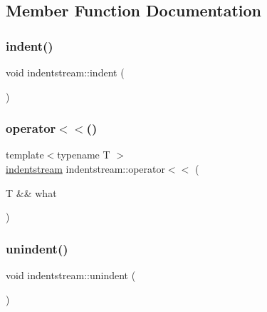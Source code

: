 \subsection{Member Function Documentation}
\mbox{\label{structindentstream_a698fbc575ef8753cf5b38d32a71cd1e4}} 
\subsubsection{\texorpdfstring{indent()}{indent()}}
{\footnotesize\ttfamily void indentstream\+::indent (\begin{DoxyParamCaption}{ }\end{DoxyParamCaption})\hspace{0.3cm}{\ttfamily [inline]}}

\mbox{\label{structindentstream_a15d0ddc057725bdfb44c9ac465d1324c}} 
\subsubsection{\texorpdfstring{operator$<$$<$()}{operator<<()}}
{\footnotesize\ttfamily template$<$typename T $>$ \\
\hyperlink{structindentstream}{indentstream} indentstream\+::operator$<$$<$ (\begin{DoxyParamCaption}\item[{T \&\&}]{what }\end{DoxyParamCaption})\hspace{0.3cm}{\ttfamily [inline]}}

\mbox{\label{structindentstream_a3721933459c8e2ed2cac1de036d6f24d}} 
\subsubsection{\texorpdfstring{unindent()}{unindent()}}
{\footnotesize\ttfamily void indentstream\+::unindent (\begin{DoxyParamCaption}{ }\end{DoxyParamCaption})\hspace{0.3cm}{\ttfamily [inline]}}



